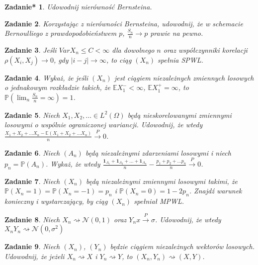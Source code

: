 \documentclass{mwart}
\newtheorem{zd}{Zadanie}
\newtheorem{zdt}[zd]{Zadanie*}
\begin{document}
\begin{zdt}
Udowodnij nierówność Bernsteina.
\end{zdt}

\begin{zd}
Korzystając z nierówności Bernsteina, udowodnij, że w schemacie Bernoulliego z prawdopodobieństwem $p$, $\frac{S_n}{n}\to p$ prawie na pewno.
\end{zd}

\begin{zd}
Jeśli $VarX_n \leq C < \infty$ dla dowolnego $n$ oraz współczynniki korelacji $\rho (X_i, X_j) \to 0$, gdy $|i-j|\to \infty$, to ciąg $(X_n)$ spełnia SPWL.
\end{zd}

\begin{zd}
Wykaż, że jeśli $(X_n)$ jest ciągiem niezależnych zmiennych losowych o jednakowym rozkładzie takich, że $\mathbb{E}X_1^- < \infty$, $\mathbb{E}X_1^+ = \infty$, to $\mathbb{P}\left(\lim_n\frac{S_n}{n} = \infty\right) = 1$.
\end{zd}

\begin{zd}
Niech $X_1, X_2, \dots \in L^2\left(\Omega \right)$ będą nieskorelowanymi zmiennymi losowymi o wspólnie ograniczonej wariancji. Udowodnij, że wtedy $\frac{X_1+X_2 + \dots  X_n - \mathbb{E}\left(X_1+X_2 + \dots  X_n\right)}{n} \xrightarrow{P} 0$.
\end{zd}

\begin{zd}
Niech $(A_n)$ będą niezależnymi zdarzeniami losowymi i niech $p_n = \mathbb{P}(A_n)$. Wykaż, że wtedy $\frac{\pmb{1}_{A_1} + \pmb{1}_{A_2} + \dots + \pmb{1}_{A_n}}{n} - \frac{p_1 + p_2 + \dots p_n}{n} \xrightarrow{P} 0$.
\end{zd}

\begin{zd}
Niech $(X_n)$ będą niezależnymi zmiennymi losowymi takimi, że $\mathbb{P}(X_n=1)=\mathbb{P}(X_n=-1) = p_n$ i $\mathbb{P}(X_n=0)=1-2p_n$. Znajdź warunek konieczny i wystarczający, by ciąg $(X_n)$ spełniał MPWL.
\end{zd}

\begin{zd}
Niech $X_n \rightsquigarrow \mathcal{N}(0, 1)$ oraz $Y_n x\xrightarrow{P} \sigma$. Udowodnij, że wtedy $X_nY_n \rightsquigarrow \mathcal{N}(0, \sigma^2)$
\end{zd}

\begin{zd}
Niech $(X_n)$, $(Y_n)$ będzie ciągiem niezależnych wektorów losowych. Udowodnij, że jeżeli $X_n \rightsquigarrow X$ i $Y_n \rightsquigarrow Y$, to $(X_n, Y_n) \rightsquigarrow (X, Y)$.
\end{zd}
\end{document}
